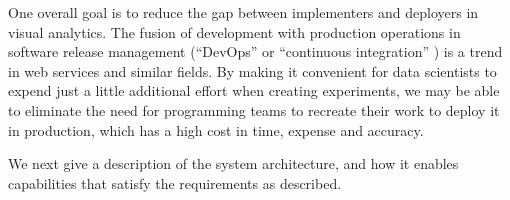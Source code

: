 One overall goal is to reduce the gap between implementers and
deployers in visual analytics. The fusion of development with
production operations in software release management (``DevOps''
\cite{Httermann:2012:DD} or ``continuous integration''
\cite{Fowler:2006:Continuous}) is a trend in web services and similar
fields. By making it convenient for data scientists to expend just a
little additional effort when creating experiments, we may be able to
eliminate the need for programming teams to recreate their work to
deploy it in production, which has a high cost in time, expense and
accuracy.

We next give a description of the system architecture,
and how it enables capabilities that satisfy the requirements as described.
